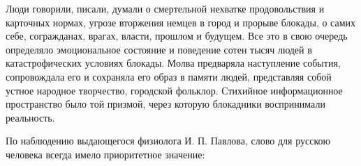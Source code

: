 \documentclass[12pt, a4paper, openany]{book}
\begin{document}
Люди говорили, писали, думали о смертельной нехватке продовольствия и карточных нормах, угрозе вторжения немцев в город и прорыве блокады, о самих себе, согражданах, врагах, власти, прошлом и будущем. Все это в свою очередь определяло эмоциональное состояние и поведение сотен тысяч людей в катастрофических условиях блокады. Молва предваряла наступление события, сопровождала его и сохраняла его образ в памяти людей, представляя собой устное народное творчество, городской фольклор. Стихийное информационное пространство было той призмой, через которую блокадники воспринимали реальность.

По наблюдению выдающегося физиолога И. П. Павлова, слово для русскою человека всегда имело приоритетное значение:



\newpage
\tableofcontents



\thispagestyle{empty} %


\newpage

\setcounter{secnumdepth}{0}
\end{document}
